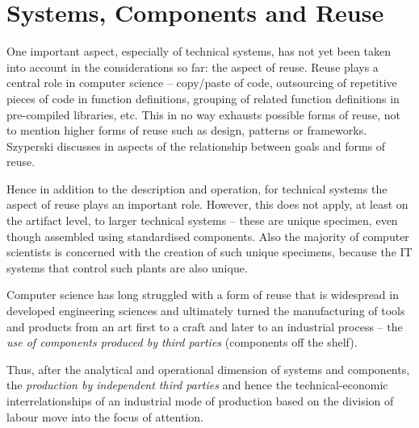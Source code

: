 \documentclass[11pt,a4paper]{article}
\begin{document}
\section{Systems, Components and Reuse}

One important aspect, especially of technical systems, has not yet been taken
into account in the considerations so far: the aspect of reuse. Reuse plays a
central role in computer science -- copy/paste of code, outsourcing of
repetitive pieces of code in function definitions, grouping of related
function definitions in pre-compiled libraries, etc. This in no way exhausts
possible forms of reuse, not to mention higher forms of reuse such as design,
patterns or frameworks. Szyperski discusses in \cite[ch. 8]{Szyperski2002}
aspects of the relationship between goals and forms of reuse.

Hence in addition to the description and operation, for technical systems the
aspect of reuse plays an important role. However, this does not apply, at
least on the artifact level, to larger technical systems – these are unique
specimen, even though assembled using standardised components. Also the
majority of computer scientists is concerned with the creation of such unique
specimens, because the IT systems that control such plants are also unique.

Computer science has long struggled with a form of reuse that is widespread in
developed engineering sciences and ultimately turned the manufacturing of
tools and products from an art first to a craft and later to an industrial
process -- the \emph{use of components produced by third parties} (components
off the shelf).

Thus, after the analytical and operational dimension of systems and
components, the \emph{production by independent third parties} and hence the
technical-economic interrelationships of an industrial mode of production
based on the division of labour move into the focus of attention.
\end{document}
